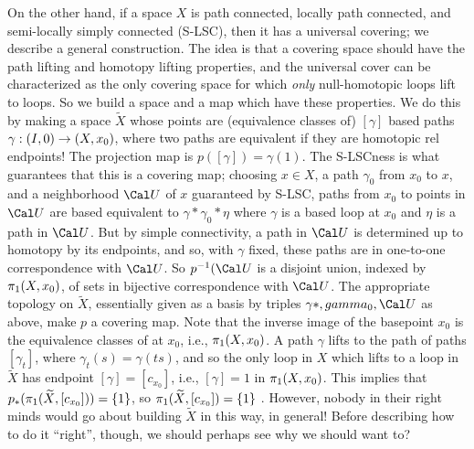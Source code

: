 On the other hand, if a space $X$ is path connected, locally path connected, and
semi-locally simply connected (S-LSC), then it has a universal covering;
we describe a general construction. The idea is that a covering
space should have the path lifting and homotopy
lifting properties, and the universal 
cover can be characterized as the only covering space for 
which {\it only} null-homotopic loops lift to loops. So we build a 
space and a map which  have these properties.
We do this by making a space $\widetilde{X}$ whose
points are (equivalence classes of) $[\gamma]$
based paths $\gamma:(I,0)\rightarrow (X,x_0)$, where two paths are equivalent
if they are homotopic rel endpoints! The projection map is
$p([\gamma])=\gamma(1)$. The S-LSCness is what guarantees that this is a 
covering map; choosing $x\in X$, a path $\gamma_0$ from $x_0$ to $x$,
and a  neighborhood ${\Cal U}$ of $x$ guaranteed by S-LSC, paths from 
$x_0$ to points in ${\Cal U}$ are based equivalent to $\gamma*\gamma_0*\eta$
where $\gamma$ is a based loop at $x_0$ and $\eta$ is a path in ${\Cal U}$.
But by simple connectivity, a path in ${\Cal U}$ is determined up to homotopy
by its endpoints, and so, with $\gamma$ fixed, these paths are in one-to-one
correspondence with ${\Cal U}$. So $p\inv({\Cal U}$ is a disjoint union,
indexed by $\pi_1(X,x_0)$, of sets in bijective correspondence with ${\Cal U}$.
The appropriate topology on $\widetilde{X}$, essentially given as a basis
by triples $\gamma*,gamma_0,{\Cal U}$ as above, make $p$ a covering map.
Note that the inverse image of 
the basepoint $x_0$ is the equivalence classes of  at $x_0$,
i.e., $\pi_1(X,x_0)$. A path $\gamma$ lifts to the path of paths
$[\gamma_t]$, where $\gamma_t(s)=\gamma(ts)$, and so the only 
loop in $X$ which lifts to a loop in $\widetilde{X}$ has endpoint
$[\gamma]=[c_{x_0}]$, i.e., $[\gamma]=1$ in $\pi_1(X,x_0)$. This
implies that $p_*(\pi_1(\widetilde{X},[c_{x_0}]))=\{1\}$, so 
$\pi_1(\widetilde{X},[c_{x_0}])=\{1\}$ . \hhsk However, nobody in their
right minds would go about building $\widetilde{X}$ in this way, in general!
Before describing how to do it ``right'', though, we should perhaps see why
we should want to?

\msk

